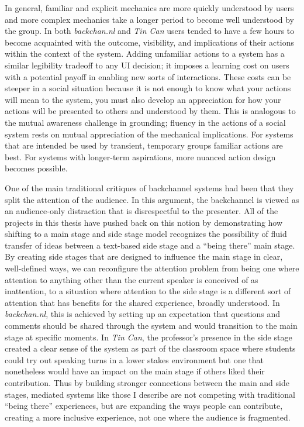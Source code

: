 In general, familiar and explicit mechanics are more quickly understood by users and more complex mechanics take a longer period to become well understood by the group. In both \emph{backchan.nl} and \emph{Tin Can} users tended to have a few hours to become acquainted with the outcome, visibility, and implications of their actions within the context of the system. Adding unfamiliar actions to a system has a similar legibility tradeoff to any UI decision; it imposes a learning cost on users with a potential payoff in enabling new sorts of interactions. These costs can be steeper in a social situation because it is not enough to know what your actions will mean to the system, you must also develop an appreciation for how your actions will be presented to others and understood by them. This is analogous to the mutual awareness challenge in grounding; fluency in the actions of a social system rests on mutual appreciation of the mechanical implications. For systems that are intended be used by transient, temporary groups familiar actions are best. For systems with longer-term aspirations, more nuanced action design becomes possible.

One of the main traditional critiques of backchannel systems had been that they split the attention of the audience. In this argument, the backchannel is viewed as an audience-only distraction that is disrespectful to the presenter. All of the projects in this thesis have pushed back on this notion by demonstrating how shifting to a main stage and side stage model recognizes the possibility of fluid transfer of ideas between a text-based side stage and a ``being there'' main stage. By creating side stages that are designed to influence the main stage in clear, well-defined ways, we can reconfigure the attention problem from being one where attention to anything other than the current speaker is conceived of as inattention, to a situation where attention to the side stage is a different sort of attention that has benefits for the shared experience, broadly understood. In \emph{backchan.nl}, this is achieved by setting up an expectation that questions and comments should be shared through the system and would transition to the main stage at specific moments. In \emph{Tin Can}, the professor's presence in the side stage created a clear sense of the system as part of the classroom space where students could try out speaking turns in a lower stakes environment but one that nonetheless would have an impact on the main stage if others liked their contribution. Thus by building stronger connections between the main and side stages, mediated systems like those I describe are not competing with traditional ``being there'' experiences, but are expanding the ways people can contribute, creating a more inclusive experience, not one where the audience is fragmented.



